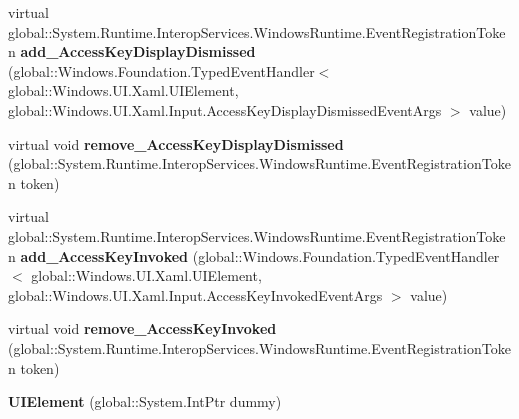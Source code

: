 \begin{DoxyCompactItemize}
\item 
\mbox{\label{class_windows_1_1_u_i_1_1_xaml_1_1_u_i_element_a15fc48463bdeec03ee1aee7533f254f0}} 
virtual global\+::\+System.\+Runtime.\+Interop\+Services.\+Windows\+Runtime.\+Event\+Registration\+Token {\bfseries add\+\_\+\+Access\+Key\+Display\+Dismissed} (global\+::\+Windows.\+Foundation.\+Typed\+Event\+Handler$<$ global\+::\+Windows.\+U\+I.\+Xaml.\+U\+I\+Element, global\+::\+Windows.\+U\+I.\+Xaml.\+Input.\+Access\+Key\+Display\+Dismissed\+Event\+Args $>$ value)
\item 
\mbox{\label{class_windows_1_1_u_i_1_1_xaml_1_1_u_i_element_a7a81e564e7ffcf9a6e1afd9c0e1dacc7}} 
virtual void {\bfseries remove\+\_\+\+Access\+Key\+Display\+Dismissed} (global\+::\+System.\+Runtime.\+Interop\+Services.\+Windows\+Runtime.\+Event\+Registration\+Token token)
\item 
\mbox{\label{class_windows_1_1_u_i_1_1_xaml_1_1_u_i_element_a15ef4390a0a3d7f9f3319b6729fd010b}} 
virtual global\+::\+System.\+Runtime.\+Interop\+Services.\+Windows\+Runtime.\+Event\+Registration\+Token {\bfseries add\+\_\+\+Access\+Key\+Invoked} (global\+::\+Windows.\+Foundation.\+Typed\+Event\+Handler$<$ global\+::\+Windows.\+U\+I.\+Xaml.\+U\+I\+Element, global\+::\+Windows.\+U\+I.\+Xaml.\+Input.\+Access\+Key\+Invoked\+Event\+Args $>$ value)
\item 
\mbox{\label{class_windows_1_1_u_i_1_1_xaml_1_1_u_i_element_a5aad5be80c6fdb9b329d9bc29673cd07}} 
virtual void {\bfseries remove\+\_\+\+Access\+Key\+Invoked} (global\+::\+System.\+Runtime.\+Interop\+Services.\+Windows\+Runtime.\+Event\+Registration\+Token token)
\item 
\mbox{\label{class_windows_1_1_u_i_1_1_xaml_1_1_u_i_element_a27bd7accff1583615f084e98079b911a}} 
{\bfseries U\+I\+Element} (global\+::\+System.\+Int\+Ptr dummy)
\end{DoxyCompactItemize}
